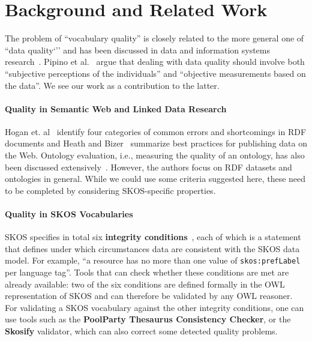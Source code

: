 
\section{Background and Related Work}\label{sec:background}

The problem of ``vocabulary quality'' is closely related to the more general one of ``data quality`'' and has been discussed in data and information systems research~\cite{Batini2009}. Pipino et al.~\cite{Pipino2002} argue that dealing with data quality should involve both ``subjective perceptions of the individuals'' and ``objective measurements based on the data''. We see our work as a contribution to the latter.

\paragraph{Quality in Semantic Web and Linked Data Research}

Hogan et. al~\cite{Hogan2010} identify four categories of common errors and shortcomings in RDF documents and Heath and Bizer~\cite{Heath2011} summarize best practices for publishing data on the Web. Ontology evaluation, i.e., measuring the quality of an ontology, has also been discussed extensively~\cite{Vrandecic2010}. However, the authors focus on RDF datasets and ontologies in general. While we could use some criteria suggested here, these need to be completed by considering SKOS-specific properties. 

\paragraph{Quality in SKOS Vocabularies}

SKOS specifies in total six \textbf{integrity conditions}~\cite{SkosReference2008}, each of which is a statement that defines under which circumstances data are consistent with the SKOS data model. For example, ``a resource has no more than one value of \texttt{skos:prefLabel} per language tag''. Tools that can check whether these conditions are met are already available: two of the six conditions are defined formally in the OWL representation of SKOS and can therefore be validated by any OWL reasoner. For validating a SKOS vocabulary against the other integrity conditions, one can use tools such as the \textbf{PoolParty Thesaurus Consistency Checker}, or the \textbf{Skosify} validator, which can also correct some detected quality problems.

